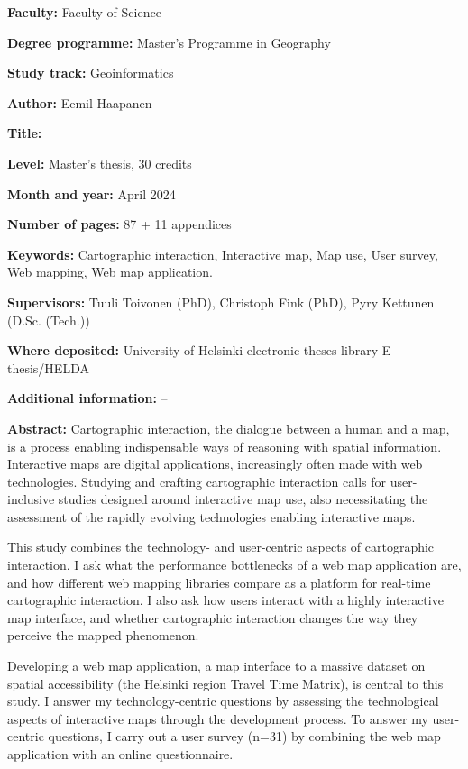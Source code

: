 \begin{spacing}{1}
\setlength{\parskip}{4pt}

\textbf{Faculty:} Faculty of Science

\textbf{Degree programme:} Master's Programme in Geography

\textbf{Study track:} Geoinformatics

\textbf{Author:} Eemil Haapanen

\textbf{Title:} \mytitle

\textbf{Level:} Master's thesis, 30 credits

\textbf{Month and year:} April 2024  %

\textbf{Number of pages:} 87 + 11 appendices  %

\textbf{Keywords:}
Cartographic interaction,
Interactive map,
Map use,
User survey,
Web mapping,
Web map application.

\textbf{Supervisors:} Tuuli Toivonen (PhD), Christoph Fink (PhD), Pyry Kettunen (D.Sc. (Tech.))

\textbf{Where deposited:} University of Helsinki electronic theses library E-thesis/HELDA

\textbf{Additional information:} --

\textbf{Abstract:}
Cartographic interaction, the dialogue between a human and a map, is
a process enabling indispensable ways of reasoning with spatial information.
Interactive maps are digital applications,
increasingly often made with web technologies.
Studying and crafting cartographic interaction calls for
user-inclusive studies designed around interactive map use,
also necessitating the assessment of the rapidly evolving technologies enabling interactive maps.

This study combines the technology- and user-centric aspects of cartographic interaction.
I ask what the performance bottlenecks of a web map application are,
and how different web mapping libraries compare as a platform for real-time cartographic interaction.
I also ask how users interact with a highly interactive map interface,
and whether cartographic interaction changes the way they perceive the mapped phenomenon.

Developing a web map application,
a map interface to a massive dataset on spatial accessibility (the Helsinki region Travel Time Matrix),
is central to this study.
I answer my technology-centric questions by assessing the technological aspects of interactive maps
through the development process.
To answer my user-centric questions,
I carry out a user survey (n=31) by combining the web map application with an online questionnaire.


\end{spacing}
